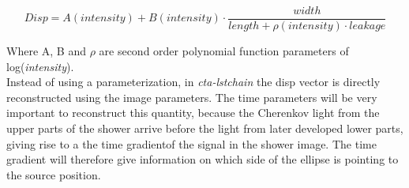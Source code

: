 \documentclass[main.tex]{subfiles}
\begin{document}
\begin{equation}
 Disp=A(intensity) + B(intensity) \cdot \frac{width}{length+\rho(intensity) \cdot leakage}  
\end{equation}

Where A, B and $\rho$ are second order polynomial function parameters of log(\textit{intensity}).\\

Instead of using a parameterization, in \textit{cta-lstchain} the disp vector is directly reconstructed using the image parameters. The time parameters will be very important to reconstruct this quantity, because the Cherenkov light from the upper parts of the shower arrive before the light from later developed lower parts, giving rise to a the time gradientof the signal in the shower image. The time gradient will therefore give information on which side of the ellipse is pointing to the source position.\\
\end{document}
